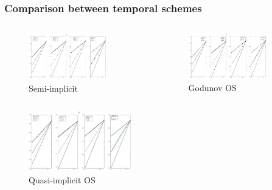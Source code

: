 \documentclass[9pt]{beamer}
\begin{document}
\begin{frame}
	\frametitle{Comparison between temporal schemes}
	\begin{columns}
		\begin{column}{0.5\textwidth}
			\begin{figure}[h]
				\includegraphics[width=0.8\textwidth]{D1_Vm_1.jpg} \caption{Semi-implicit}
			\end{figure}
		\end{column}
		\begin{column}{0.5\textwidth}
			\begin{figure}[h]
				\includegraphics[width=0.8\textwidth]{D1_Vm_1_GO.jpg} \caption{Godunov OS}
			\end{figure}
		\end{column}
	\end{columns}
    \vspace{-4mm}
    \begin{figure}[h]
    	\includegraphics[width=0.4\textwidth]{D1_Vm_1_OS.jpg} \caption{Quasi-implicit OS}
    \end{figure}
\end{frame}
\end{document}
